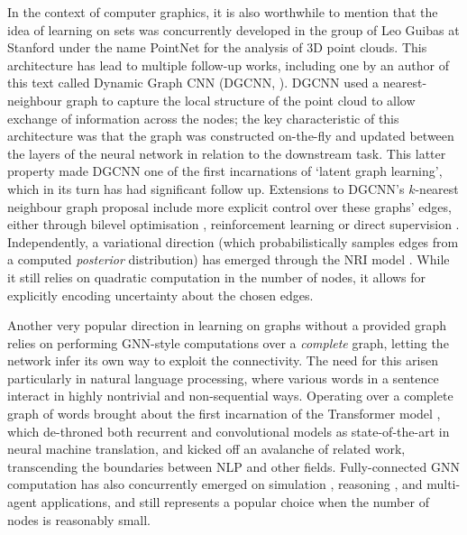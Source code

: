 In the context of computer graphics, it is also worthwhile to mention that the idea of learning on sets \citep{zaheer2017deep} was concurrently developed in the group of Leo Guibas at Stanford under the name PointNet \citep{qi2017pointnet} for the analysis of 3D point clouds. This architecture has lead to multiple follow-up works, including one by an author of this text called Dynamic Graph CNN (DGCNN, \cite{wang2019dynamic}). DGCNN used a nearest-neighbour graph to capture the local structure of the point cloud to allow exchange of information across the nodes; the key characteristic of this architecture was that the graph was constructed on-the-fly and updated between the layers of the neural network in relation to the downstream task. 
%
This latter property made DGCNN one of the first incarnations of `latent graph learning', which in its turn has had significant follow up. Extensions to DGCNN's $k$-nearest neighbour graph proposal include more explicit control over these graphs' edges, either through bilevel optimisation \citep{franceschi2019learning}, reinforcement learning \citep{kazi2020differentiable} or direct supervision \citep{velivckovic2020pointer}. Independently, a variational direction (which probabilistically samples edges from a computed \emph{posterior} distribution) has emerged through the NRI model \citep{kipf2018neural}. While it still relies on quadratic computation in the number of nodes, it allows for explicitly encoding uncertainty about the chosen edges.

Another very popular direction in learning on graphs without a provided graph relies on performing GNN-style computations over a \emph{complete} graph, letting the network infer its own way to exploit the connectivity. The need for this arisen particularly in natural language processing, where various words in a sentence interact in highly nontrivial and non-sequential ways. Operating over a complete graph of words brought about the first incarnation of the Transformer model \citep{vaswani2017attention}, which de-throned both recurrent and convolutional models as state-of-the-art in neural machine translation, and kicked off an avalanche of related work, transcending the boundaries between NLP and other fields. Fully-connected GNN computation has also concurrently emerged on simulation \citep{battaglia2016interaction}, reasoning \citep{santoro2017simple}, and multi-agent \citep{hoshen2017vain} applications, and still represents a popular choice when the number of nodes is reasonably small.
%

